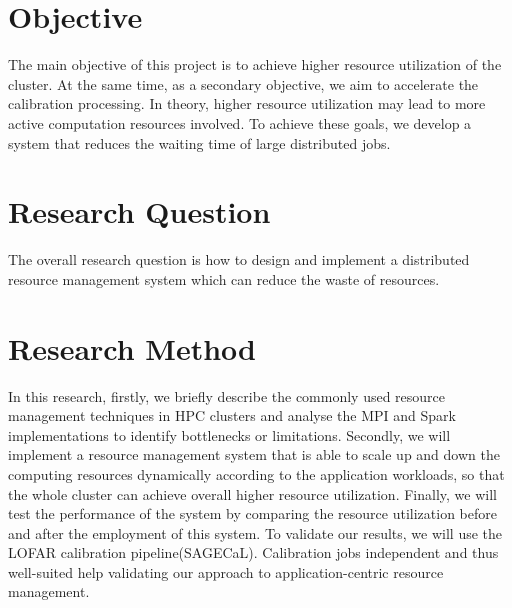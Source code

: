 \section{Objective}

The main objective of this project is to achieve higher resource utilization of the cluster. 
At the same time, as a secondary objective, we aim to accelerate the calibration processing. 
In theory, higher resource utilization may lead to more active computation resources involved. 
To achieve these goals, we develop a system that reduces the waiting time of large distributed jobs.
\section{Research Question}
The overall research question is how to design and implement a distributed resource management system which can reduce the waste of resources.

\section{Research Method}
In this research, firstly, we briefly describe the commonly used resource management techniques in HPC clusters and analyse the  MPI and Spark implementations to identify bottlenecks or limitations.
Secondly, we will implement a resource management system that is able to scale up and down the computing resources dynamically according to the application workloads, so that the whole cluster can achieve overall higher resource utilization. 
Finally, we will test the performance of the system by comparing the resource utilization before and after the employment of this system. 
To validate our results, we will use the LOFAR calibration pipeline(SAGECaL). 
Calibration jobs independent and thus well-suited help validating our approach to application-centric resource management.